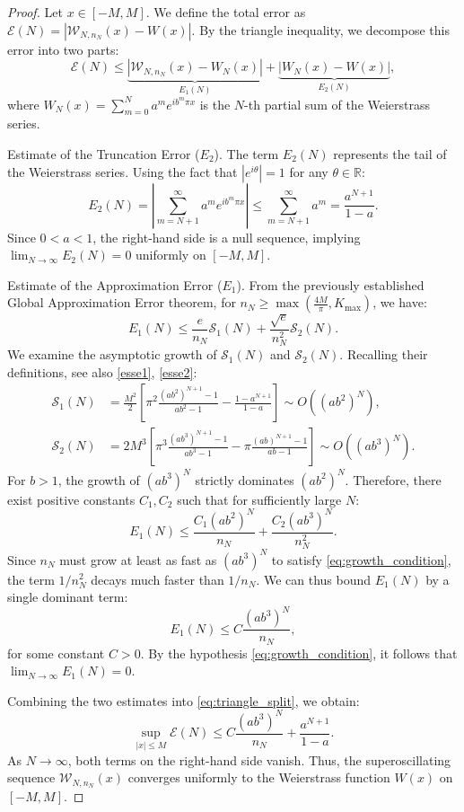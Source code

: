 \documentclass[reqno,11pt]{amsart}
\theoremstyle{definition}
\begin{document}
\begin{proof}
Let $x \in [-M, M]$. We define the total error as $\mathcal{E}(N) = \left| \mathcal{W}_{N, n_N}(x) - W(x) \right|$. By the triangle inequality, we decompose this error into two parts:
\begin{equation} \label{eq:triangle_split}
    \mathcal{E}(N) \leq \underbrace{\left| \mathcal{W}_{N, n_N}(x) - W_N(x) \right|}_{E_1(N)} + \underbrace{\left| W_N(x) - W(x) \right|}_{E_2(N)},
\end{equation}
where $W_N(x) = \sum_{m=0}^{N} a^m e^{i b^m \pi x}$ is the $N$-th partial sum of the Weierstrass series.

\medskip
 Estimate of the Truncation Error ($E_2$).
The term $E_2(N)$ represents the tail of the Weierstrass series. Using the fact that $|e^{i \theta}| = 1$ for any $\theta \in \mathbb{R}$:
\[
    E_2(N) = \left| \sum_{m=N+1}^{\infty} a^m e^{i b^m \pi x} \right| \leq \sum_{m=N+1}^{\infty} a^m = \frac{a^{N+1}}{1-a}.
\]
Since $0 < a < 1$, the right-hand side is a null sequence, implying $\lim_{N \to \infty} E_2(N) = 0$ uniformly on $[-M, M]$.

\medskip
 Estimate of the Approximation Error ($E_1$).
From the previously established Global Approximation Error theorem, for $n_N \ge \max(\frac{4M}{\pi}, K_{\max})$, we have:
\[
    E_1(N) \leq \frac{e}{n_N} \mathcal{S}_1(N) + \frac{\sqrt{e}}{n_N^2} \mathcal{S}_2(N).
\]
We examine the asymptotic growth of $\mathcal{S}_1(N)$ and $\mathcal{S}_2(N)$. Recalling their definitions, see also \eqref{esse1}, \eqref{esse2}:
\begin{align*}
    \mathcal{S}_1(N) &= \frac{M^2}{2} \left[ \pi^2 \frac{(ab^2)^{N+1}-1}{ab^2-1} - \frac{1-a^{N+1}}{1-a} \right] \sim O\left((ab^2)^N\right), \\
    \mathcal{S}_2(N) &= 2M^3 \left[ \pi^3 \frac{(ab^3)^{N+1}-1}{ab^3-1} - \pi \frac{(ab)^{N+1}-1}{ab-1} \right] \sim O\left((ab^3)^N\right).
\end{align*}
For $b > 1$, the growth of $(ab^3)^N$ strictly dominates $(ab^2)^N$. Therefore, there exist positive constants $C_1, C_2$ such that for sufficiently large $N$:
\[
    E_1(N) \leq \frac{C_1 (ab^2)^N}{n_N} + \frac{C_2 (ab^3)^N}{n_N^2}.
\]
Since $n_N$ must grow at least as fast as $(ab^3)^N$ to satisfy \eqref{eq:growth_condition}, the term $1/n_N^2$ decays much faster than $1/n_N$. We can thus bound $E_1(N)$ by a single dominant term:
\[
    E_1(N) \leq C \frac{(ab^3)^N}{n_N},
\]
for some constant $C > 0$. By the hypothesis \eqref{eq:growth_condition}, it follows that $\lim_{N \to \infty} E_1(N) = 0$.

\medskip
Combining the two estimates into \eqref{eq:triangle_split}, we obtain:
\[
    \sup_{|x| \le M} \mathcal{E}(N) \leq C \frac{(ab^3)^N}{n_N} + \frac{a^{N+1}}{1-a}.
\]
As $N \to \infty$, both terms on the right-hand side vanish. Thus, the superoscillating sequence $\mathcal{W}_{N, n_N}(x)$ converges uniformly to the Weierstrass function $W(x)$ on $[-M, M]$.
\end{proof}
\end{document}
